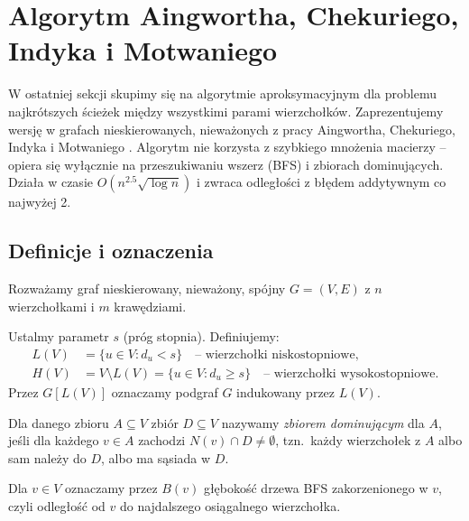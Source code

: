 \chapter{Algorytm Aingwortha, Chekuriego, Indyka i Motwaniego}

W ostatniej sekcji skupimy się na algorytmie aproksymacyjnym dla problemu najkrótszych ścieżek między wszystkimi parami wierzchołków. Zaprezentujemy wersję w grafach nieskierowanych, nieważonych z pracy Aingwortha, Chekuriego, Indyka i Motwaniego \cite{Aingworth1999}. Algorytm nie korzysta z szybkiego mnożenia macierzy -- opiera się wyłącznie na przeszukiwaniu wszerz (BFS) i zbiorach dominujących. Działa w czasie $O(n^{2.5}\sqrt{\log n})$ i zwraca odległości z błędem addytywnym co najwyżej 2.

\section{Definicje i oznaczenia}

Rozważamy graf nieskierowany, nieważony, spójny $G = (V, E)$ z $n$ wierzchołkami i $m$ krawędziami.

\begin{definicja}
Ustalmy parametr $s$ (próg stopnia). Definiujemy:
\begin{align*}
L(V) &= \{u \in V \colon d_u < s\} \quad \text{-- wierzchołki niskostopniowe},\\
H(V) &= V \setminus L(V) = \{u \in V \colon d_u \geq s\} \quad \text{-- wierzchołki wysokostopniowe}.
\end{align*}
Przez $G[L(V)]$ oznaczamy podgraf $G$ indukowany przez $L(V)$.
\end{definicja}

\begin{definicja}
Dla danego zbioru $A \subseteq V$ zbiór $D \subseteq V$ nazywamy \emph{zbiorem dominującym} dla $A$, jeśli dla każdego $v \in A$ zachodzi $N(v) \cap D \neq \emptyset$, tzn.\ każdy wierzchołek z $A$ albo sam należy do $D$, albo ma sąsiada w $D$.
\end{definicja}

\begin{definicja}
Dla $v \in V$ oznaczamy przez $B(v)$ głębokość drzewa BFS zakorzenionego w $v$, czyli odległość od $v$ do najdalszego osiągalnego wierzchołka.
\end{definicja}

